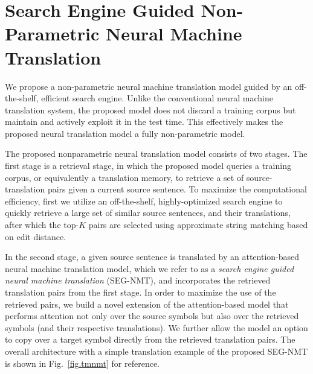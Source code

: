 \section{Search Engine Guided Non-Parametric Neural Machine Translation}

We propose a non-parametric
neural machine translation model guided by an off-the-shelf, efficient search engine. Unlike the conventional neural machine translation system, the proposed model does not discard a training corpus but maintain and actively exploit it in the test time. This effectively makes the proposed neural translation model a fully non-parametric model.

The proposed nonparametric
neural translation model consists of two stages. The first stage is a retrieval stage, in which the proposed model queries a training corpus, or equivalently a translation memory, to retrieve a set of source-translation pairs given a current source sentence. To maximize the computational efficiency, first we utilize an off-the-shelf, highly-optimized search engine to quickly retrieve a large set of similar source sentences, and their translations, after which the top-$K$ pairs are selected using approximate string matching based on edit distance. 

In the second stage, a given source sentence is translated by an attention-based neural machine translation model, which we refer to as a {\it search engine guided neural machine translation} (SEG-NMT), and incorporates the retrieved translation pairs from the first stage. In order to maximize the use of the retrieved pairs, we build a novel extension of the attention-based model that performs attention not only over the source symbols but also over the retrieved symbols (and their respective translations). We further allow the model an option to copy over a target symbol directly from the retrieved translation pairs. The overall architecture with a simple translation example of the proposed SEG-NMT is shown in Fig.~\ref{fig.tmnmt} for reference.





